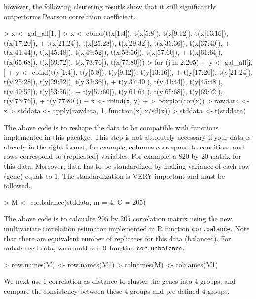 \documentclass[a4paper]{article}
\begin{document}
however, the following clsutering resutls show that it still significantly outperforms Pearson
correlation coefficient.    
\begin{Schunk}
\begin{Sinput}
> x <- gal_all[1, ]
> x <- cbind(t(x[1:4]), t(x[5:8]), t(x[9:12]), t(x[13:16]), t(x[17:20]), 
+     t(x[21:24]), t(x[25:28]), t(x[29:32]), t(x[33:36]), t(x[37:40]), 
+     t(x[41:44]), t(x[45:48]), t(x[49:52]), t(x[53:56]), t(x[57:60]), 
+     t(x[61:64]), t(x[65:68]), t(x[69:72]), t(x[73:76]), t(x[77:80]))
> for (j in 2:205) {
+     y <- gal_all[j, ]
+     y <- cbind(t(y[1:4]), t(y[5:8]), t(y[9:12]), t(y[13:16]), 
+         t(y[17:20]), t(y[21:24]), t(y[25:28]), t(y[29:32]), t(y[33:36]), 
+         t(y[37:40]), t(y[41:44]), t(y[45:48]), t(y[49:52]), t(y[53:56]), 
+         t(y[57:60]), t(y[61:64]), t(y[65:68]), t(y[69:72]), t(y[73:76]), 
+         t(y[77:80]))
+     x <- rbind(x, y)
+ }
> boxplot(cor(x))
> rawdata <- x
> stddata <- apply(rawdata, 1, function(x) x/sd(x))
> stddata <- t(stddata)
\end{Sinput}
\end{Schunk}
The above code is to reshape the data to be compatible with functions implemented
in this pacakge. This step is not absolutely necessary if your data is already in
the right format, for example, columns correspond to conditions and rows correspond
to (replicated) variables. For example, a $820$ by $20$ matrix for this data. Moreover, 
data has to be standardized by making variance of each row (gene) equals to $1$. The 
standardization is VERY important and must be followed.
\begin{Schunk}
\begin{Sinput}
> M <- cor.balance(stddata, m = 4, G = 205)
\end{Sinput}
\end{Schunk}
The above code is to calcualte $205$ by $205$ correlation matrix using the new
multivariate correlation estimator implemented in R function \texttt{cor.balance}.
Note that there are equivalent number of replicates for this data (balanced). For
unbalanced data, we should use R function \texttt{cor.unbalance}. 
\begin{Schunk}
\begin{Sinput}
> row.names(M) <- row.names(M1)
> colnames(M) <- colnames(M1)
\end{Sinput}
\end{Schunk}
We next use 1-correlation as distance to cluster the genes into $4$ groups, and
compare the consistency between these $4$ groups and pre-defined $4$ groups.
\end{document}
